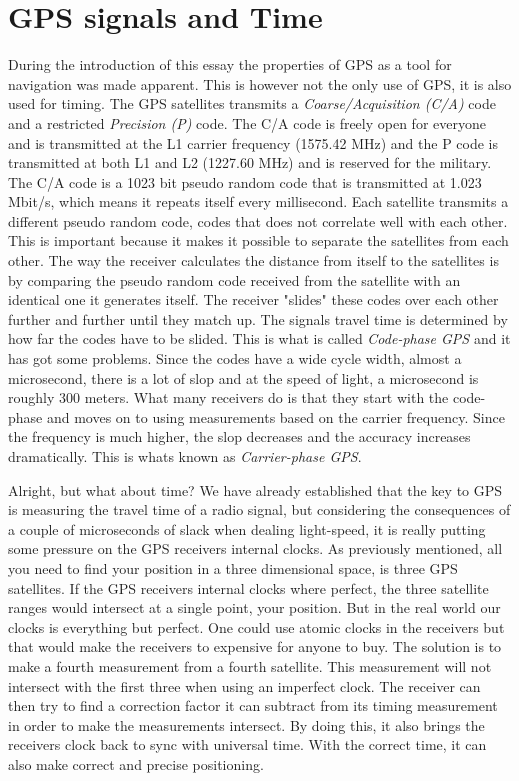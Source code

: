 \documentclass[12pt,english,a4paper]{article}
\begin{document}
\section{GPS signals and Time}\label{GST}
During the introduction of this essay the properties of GPS as a tool for navigation was made apparent. This is however not the only use of GPS, it is also used for timing. The GPS satellites transmits a \textit{Coarse/Acquisition (C/A)} code and a restricted \textit{Precision (P)} code. The C/A code is freely open for everyone and is transmitted at the L1 carrier frequency (1575.42 MHz) and the P code is transmitted at both L1 and L2 (1227.60 MHz) and is reserved for the military. The C/A code is a 1023 bit pseudo random code that is transmitted at 1.023 Mbit/s, which means it repeats itself every millisecond. Each satellite transmits a different pseudo random code, codes that does not correlate well with each other. This is important because it makes it possible to separate the satellites from each other. The way the receiver calculates the distance from itself to the satellites is by comparing the pseudo random code received from the satellite with an identical one it generates itself. The receiver "slides" these codes over each other further and further until they match up. The signals travel time is determined by how far the codes have to be slided. This is what is called \textit{Code-phase GPS} and it has got some problems. Since the codes have a wide cycle width, almost a microsecond, there is a lot of slop and at the speed of light, a microsecond is roughly 300 meters. What many receivers do is that they start with the code-phase and moves on to using measurements based on the carrier frequency. Since the frequency is much higher, the slop decreases and the accuracy increases dramatically. This is whats known as \textit{Carrier-phase GPS}. 

Alright, but what about time? We have already established that the key to GPS is measuring the travel time of a radio signal, but considering the consequences of a couple of microseconds of slack when dealing light-speed, it is really putting some pressure on the GPS receivers internal clocks. As previously mentioned, all you need to find your position in a three dimensional space, is three GPS satellites. If the GPS receivers internal clocks where perfect, the three satellite ranges would intersect at a single point, your position. But in the real world our clocks is everything but perfect. One could use atomic clocks in the receivers but that would make the receivers to expensive for anyone to buy. The solution is to make a fourth measurement from a fourth satellite. This measurement will not intersect with the first three when using an imperfect clock. The receiver can then try to find a correction factor it can subtract from its timing measurement in order to make the measurements intersect. By doing this, it also brings the receivers clock back to sync with universal time. With the correct time, it can also make correct and precise positioning. \cite{TRIMBLETIME}
\end{document}
